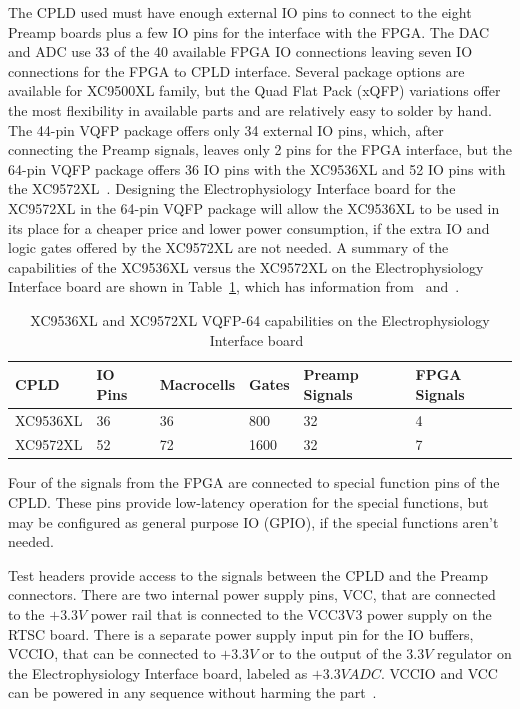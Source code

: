 The CPLD used must have enough external IO pins to connect to the eight Preamp boards plus a few IO pins for the interface with the FPGA.  The DAC and ADC use 33 of the 40 available FPGA IO connections leaving seven IO connections for the FPGA to CPLD interface.  Several package options are available for XC9500XL family, but the Quad Flat Pack (xQFP) variations offer the most flexibility in available parts and are relatively easy to solder by hand.  The 44-pin VQFP package offers only 34 external IO pins, which, after connecting the Preamp signals, leaves only 2 pins for the FPGA interface, but the 64-pin VQFP package offers 36 IO pins with the XC9536XL and 52 IO pins with the XC9572XL~\cite{DesignXC9500XLappnote}.  Designing the Electrophysiology Interface board for the XC9572XL in the 64-pin VQFP package will allow the XC9536XL to be used in its place for a cheaper price and lower power consumption, if the extra IO and logic gates offered by the XC9572XL are not needed.  A summary of the capabilities of the XC9536XL versus the XC9572XL on the Electrophysiology Interface board are shown in Table~\ref{tab:CPLDMigration}, which has information from~\cite{XC9500XLds} and~\cite{DesignXC9500XLappnote}.

\renewcommand{\arraystretch}{1.3}
\begin{table}[h]
\centering 
\begin{tabular}{|l|l|l|l|l|l|}

\hline
CPLD	& IO Pins & Macrocells & Gates & Preamp Signals & FPGA Signals\\
\hline
XC9536XL	& 36 & 36 & 800 & 32 & 4\\
\hline
XC9572XL	& 52 & 72 & 1600 & 32 & 7\\
\hline
\end{tabular}
\caption{XC9536XL and XC9572XL VQFP-64 capabilities on the Electrophysiology Interface board~\cite{XC9500XLds,DesignXC9500XLappnote}\label{tab:CPLDMigration} }

\end{table}
\renewcommand{\arraystretch}{1.0}

Four of the signals from the FPGA are connected to special function pins of the CPLD.  These pins provide low-latency operation for the special functions, but may be configured as general purpose IO (GPIO), if the special functions aren't needed.

Test headers provide access to the signals between the CPLD and the Preamp connectors.  There are two internal power supply pins, VCC, that are connected to the $+3.3\unit{V}$ power rail that is connected to the VCC3V3 power supply on the RTSC board.  There is a separate power supply input pin for the IO buffers, VCCIO, that can be connected to $+3.3\unit{V}$ or to the output of the $3.3\unit{V}$ regulator on the Electrophysiology Interface board, labeled as $+3.3\unit{VADC}$.  VCCIO and VCC can be powered in any sequence without harming the part~\cite{DesignXC9500XLappnote}.

